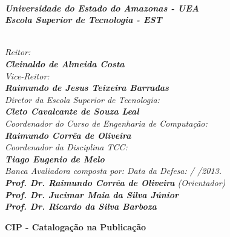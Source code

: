\documentclass{dcctese}
\begin{document}
\newpage


\textit{\textbf{\\
Universidade do Estado do Amazonas - UEA\\
Escola Superior de Tecnologia - EST}}

\textit{\\
Reitor:\\ 
\textbf{
Cleinaldo de Almeida Costa}\\
Vice-Reitor:\\ \textbf{Raimundo de Jesus Teixeira Barradas}}
\\
\textit{
Diretor da Escola Superior de Tecnologia:\\ 
\textbf{Cleto Cavalcante de Souza Leal}}
\\
\textit{
Coordenador do Curso de Engenharia de Computa\c{c}\~{a}o:\\
\textbf{Raimundo Corr\^{e}a de Oliveira}}
\\
\textit{
Coordenador da Disciplina TCC:\\
\textbf{Tiago Eugenio de Melo}}
\\[12pt]
\textit{
Banca Avaliadora composta por: \hfill Data da Defesa:  /  /2013.\\
}
\textit{ 
\textbf{Prof. Dr. Raimundo Corr\^{e}a de Oliveira} (Orientador)\\
\textbf{Prof. Dr. Jucimar Maia da Silva J\'{u}nior}\\%
\textbf{Prof. Dr. Ricardo da Silva Barboza}
}

\begin{center}\large \bf CIP - Cataloga\c{c}\~{a}o na Publica\c{c}\~{a}o\end{center}\\
\begin{center}
\end{center}
\end{document}
